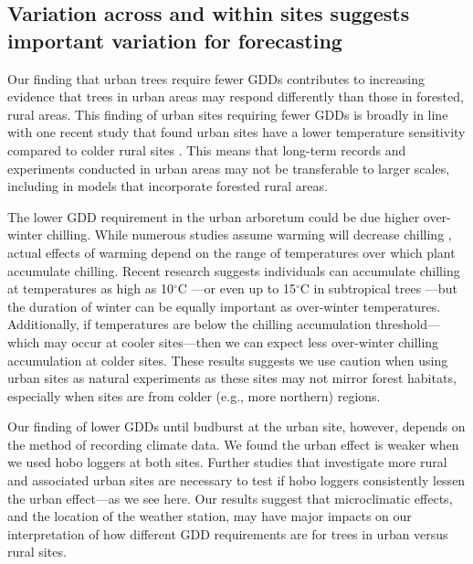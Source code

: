 \documentclass{article}\usepackage[]{graphicx}\usepackage[]{color}
\begin{document}
\subsection*{Variation across and within sites suggests important variation for forecasting} 
Our finding that urban trees require fewer GDDs contributes to increasing evidence that trees in urban areas may respond differently than those in forested, rural areas. This finding of urban sites requiring fewer GDDs is broadly in line with one recent study that found urban sites have a lower temperature sensitivity compared to colder rural sites \citep{Meng2020}. This means that long-term records and experiments conducted in urban areas may not be transferable to larger scales, including in models that incorporate forested rural areas. 

The lower GDD requirement in the urban arboretum could be due higher over-winter chilling. While numerous studies assume warming will decrease chilling \citep{Asse2018, Fu2015, Luedeling2011}, actual effects of warming depend on the range of temperatures over which plant accumulate chilling. Recent research suggests individuals can accumulate chilling at temperatures as high as 10$^{\circ}$C \citep{Baumgarten2021}---or even up to 15$^{\circ}$C in subtropical trees \citep{Zhang2021}---but the duration of winter can be equally important as over-winter temperatures. Additionally, if temperatures are below the chilling accumulation threshold---which may occur at cooler sites---then we can expect less over-winter chilling accumulation at colder sites. These results suggests we use caution when using urban sites as natural experiments as these sites may not mirror forest habitats, especially when sites are from colder (e.g., more northern) regions.

Our finding of lower GDDs until budburst at the urban site, however, depends on the method of recording climate data. We found the urban effect is weaker when we used hobo loggers at both sites. Further studies that investigate more rural and associated urban sites are necessary to test if hobo loggers consistently lessen the urban effect---as we see here. Our results suggest that microclimatic effects, and the location of the weather station, may have major impacts on our interpretation of how different GDD requirements are for trees in urban versus rural sites. 
\end{document}
